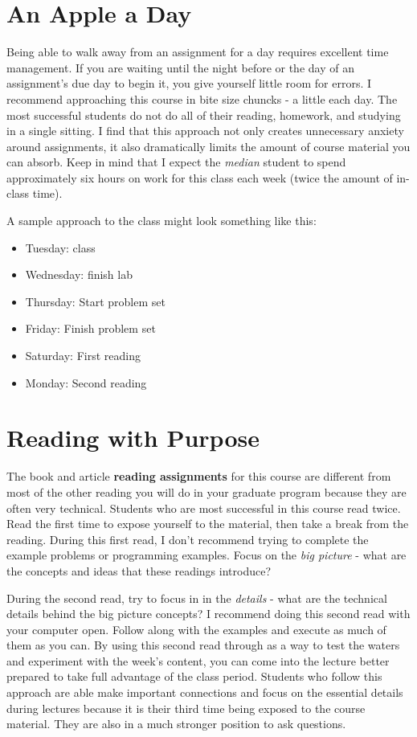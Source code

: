 \documentclass[]{book}
\providecommand{\tightlist}{%
  \setlength{\itemsep}{0pt}\setlength{\parskip}{0pt}}
\begin{document}
\section{An Apple a Day}\label{an-apple-a-day}

Being able to walk away from an assignment for a day requires excellent
time management. If you are waiting until the night before or the day of
an assignment's due day to begin it, you give yourself little room for
errors. I recommend approaching this course in bite size chuncks - a
little each day. The most successful students do not do all of their
reading, homework, and studying in a single sitting. I find that this
approach not only creates unnecessary anxiety around assignments, it
also dramatically limits the amount of course material you can absorb.
Keep in mind that I expect the \emph{median} student to spend
approximately six hours on work for this class each week (twice the
amount of in-class time).

A sample approach to the class might look something like this:

\begin{itemize}
\tightlist
\item
  Tuesday: class
\item
  Wednesday: finish lab
\item
  Thursday: Start problem set
\item
  Friday: Finish problem set
\item
  Saturday: First reading
\item
  Monday: Second reading
\end{itemize}

\section{Reading with Purpose}\label{reading-with-purpose}

The book and article \textbf{reading assignments} for this course are
different from most of the other reading you will do in your graduate
program because they are often very technical. Students who are most
successful in this course read twice. Read the first time to expose
yourself to the material, then take a break from the reading. During
this first read, I don't recommend trying to complete the example
problems or programming examples. Focus on the \emph{big picture} - what
are the concepts and ideas that these readings introduce?

During the second read, try to focus in in the \emph{details} - what are
the technical details behind the big picture concepts? I recommend doing
this second read with your computer open. Follow along with the examples
and execute as much of them as you can. By using this second read
through as a way to test the waters and experiment with the week's
content, you can come into the lecture better prepared to take full
advantage of the class period. Students who follow this approach are
able make important connections and focus on the essential details
during lectures because it is their third time being exposed to the
course material. They are also in a much stronger position to ask
questions.
\end{document}
